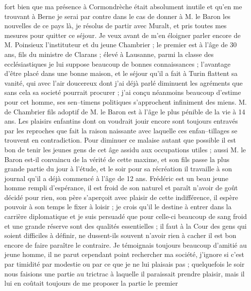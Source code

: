 \documentclass[12pt]{article}
\begin{document}
 fort bien que ma présence à Cormondrèche était
absolument inutile et qu’en me trouvant à Berne je serai par contre dans le cas de donner à M. le
Baron les nouvelles de ce pays là, je résolus de partir avec Muralt, et pris toutes mes mesures pour
quitter ce séjour. Je veux avant de m’en éloigner parler encore de M. Poinsieux l’instituteur et du
jeune Chambrier ; le premier est à l’âge de 30 ans, fils du ministre de Clarans ; élevé à Lausanne,
parmi la classe des ecclésiastiques je lui suppose beaucoup de bonnes connaissances ; l’avantage
d’être placé dans une bonne maison, et le séjour qu’il a fait à Turin flattent sa vanité, qui avec
l’air doucereux dont j’ai déjà parlé diminuent les agréments que sans cela sa societé pourrait
procurer ; j’ai conçu néanmoins beaucoup d’estime pour cet homme, ses sen–timens politiques
s’approchent infiniment des miens. M. de Chambrier fils adoptif de M. le Baron est à l’âge le plus
pénible de la vie à 14 ans. Les plaisirs enfantins dont on voudrait jouir encore sont toujours
entravés par les reproches que fait la raison naissante avec laquelle ces enfan–tillages se trouvent
en contradiction. Pour diminuer ce malaise autant que possible il est bon de tenir les jeunes gens
de cet âge assidu aux occupations utiles ; aussi M. le Baron est-il convaincu de la vérité de cette
maxime, et son fils passe la plus grande partie du jour à l’étude, et le soir pour sa récréation il
travaille à son journal qu’il a déjà commencé à l’âge de 12 ans. Frédéric est un beau jeune homme
rempli d’espérance, il est froid de son naturel et paraît n’avoir de goût décidé pour rien, son père
s’aperçoit avec plaisir de cette indifférence, il espère pouvoir à son temps le fixer à loisir ; je
crois qu’il le destine à entrer dans la carrière diplomatique et je suis persuadé que pour celle-ci
beaucoup de sang froid et une grande réserve sont des qualités essentielles ; il faut à la Cour des
gens qui soient difficiles à définir, ne dussent-ils souvent n’avoir rien à cacher il est bon encore
de faire paraître le contraire. Je témoignais toujours beaucoup d’amitié au jeune homme, il ne parut
cependant point rechercher ma société, j’ignore si c’est par timidité par modestie ou par ce que je
ne lui plaisais pas ; quelquefois le soir nous faisions une partie au trictrac à laquelle il
paraissait prendre plaisir, mais il lui en coûtait toujours de me proposer la partie le premier
\end{document}
